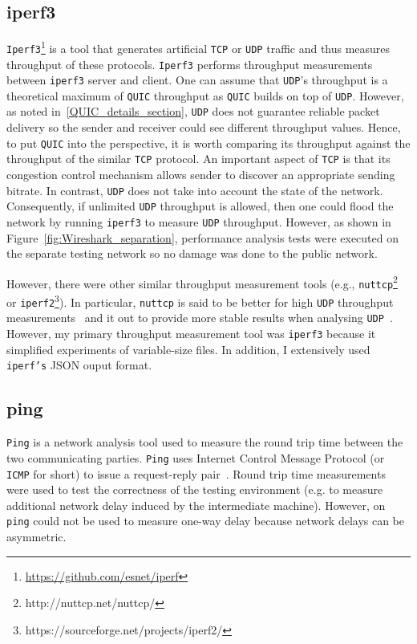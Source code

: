\documentclass[12pt,a4paper,twoside,openright]{report}
\newcommand\note[2]{{\color{#1}\bf #2}}
\newcommand\simon[1]{\ifcomments{\note{cyan}{SM: #1}}\fi}
\begin{document}
\subsection{iperf3}
\texttt{Iperf3}\footnote{\url{https://github.com/esnet/iperf}} is a tool that generates artificial \texttt{TCP} or \texttt{UDP} traffic and thus measures throughput of these protocols.
\texttt{Iperf3} performs throughput measurements between \texttt{iperf3} server and client.
One can assume that \texttt{UDP}'s throughput is a theoretical maximum of \texttt{QUIC} throughput as \texttt{QUIC} builds on top of \texttt{UDP}.
However, as noted in~\ref{QUIC_details_section}, \texttt{UDP} does not guarantee reliable packet delivery so the sender and receiver could see different throughput values.
Hence, to put \texttt{QUIC} into the perspective, it is worth comparing its throughput against the throughput of the similar \texttt{TCP} protocol.
An important aspect of \texttt{TCP} is that its congestion control mechanism allows sender to discover an appropriate sending bitrate.
In contrast, \texttt{UDP} does not take into account the state of the network.
Consequently, if unlimited \texttt{UDP} throughput is allowed, then one could flood the network by running \texttt{iperf3} to measure \texttt{UDP} throughput.
However, as shown in Figure~\ref{fig:Wireshark_separation}, performance analysis tests were executed on the separate testing network so no damage was done to the public network.

However, there were other similar throughput measurement tools (e.g., \texttt{nuttcp}\footnote{http://nuttcp.net/nuttcp/} or \texttt{iperf2}\footnote{https://sourceforge.net/projects/iperf2/}).
In particular, \texttt{nuttcp} is said to be better for high \texttt{UDP} throughput measurements~\cite{network-troubleshooting-tools_nuttcp} and it out to provide more stable results when analysing \texttt{UDP}~\cite{Nuttcp_geant}.
However, my primary throughput measurement tool was \texttt{iperf3} because it simplified experiments of variable-size files.
In addition, I extensively used \texttt{iperf's} JSON ouput format.



\subsection{ping}
\texttt{Ping} is a network analysis tool used to measure the round trip time between the two communicating parties.
\texttt{Ping} uses Internet Control Message Protocol (or \texttt{ICMP} for short) to issue a request-reply pair~\cite{internet-control-message-protocol-icmp}.
Round trip time measurements were used to test the correctness of the testing environment (e.g. to measure additional network delay induced by the intermediate machine).
However, on \texttt{ping} could not be used to measure one-way delay because network delays can be asymmetric.
\end{document}
